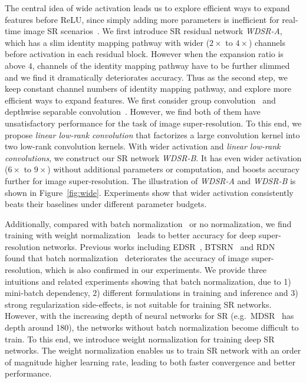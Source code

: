 \documentclass{article}
\begin{document}
The central idea of wide activation leads us to explore efficient ways to expand features before ReLU, since simply adding more parameters is inefficient for real-time image SR scenarios~\cite{goto2014super}. We first introduce SR residual network \textit{WDSR-A}, which has a slim identity mapping pathway with wider (\(2\times\) to \(4\times\)) channels before activation in each residual block. However when the expansion ratio is above \(4\), channels of the identity mapping pathway have to be further slimmed and we find it dramatically deteriorates accuracy. Thus as the second step, we keep constant channel numbers of identity mapping pathway, and explore more efficient ways to expand features. We first consider group convolution~\cite{xie2017aggregated} and depthwise separable convolution~\cite{chollet2016xception}. However, we find both of them have unsatisfactory performance for the task of image super-resolution. To this end, we propose \textit{linear low-rank convolution} that factorizes a large convolution kernel into two low-rank convolution kernels. With wider activation and \textit{linear low-rank convolutions}, we construct our SR network \textit{WDSR-B}. It has even wider activation (\(6\times\) to \(9\times\)) without additional parameters or computation, and boosts accuracy further for image super-resolution. The illustration of \textit{WDSR-A} and \textit{WDSR-B} is shown in Figure~\ref{fig:wide}. Experiments show that wider activation consistently beats their baselines under different parameter budgets.

Additionally, compared with batch normalization~\cite{ioffe2015batch} or no normalization, we find training with weight normalization~\cite{salimans2016weight} leads to better accuracy for deep super-resolution networks. Previous works including EDSR~\cite{lim2017enhanced}, BTSRN~\cite{fan2017balanced} and RDN~\cite{2018arXiv180208797Z} found that batch normalization~\cite{ioffe2015batch} deteriorates the accuracy of image super-resolution, which is also confirmed in our experiments. We provide three intuitions and related experiments showing that batch normalization, due to 1) mini-batch dependency, 2) different formulations in training and inference and 3) strong regularization side-effects, is not suitable for training SR networks. However, with the increasing depth of neural networks for SR (e.g.\ MDSR~\cite{lim2017enhanced} has depth around 180), the networks without batch normalization become difficult to train. To this end, we introduce weight normalization for training deep SR networks. The weight normalization enables us to train SR network with an order of magnitude higher learning rate, leading to both faster convergence and better performance.
\end{document}
